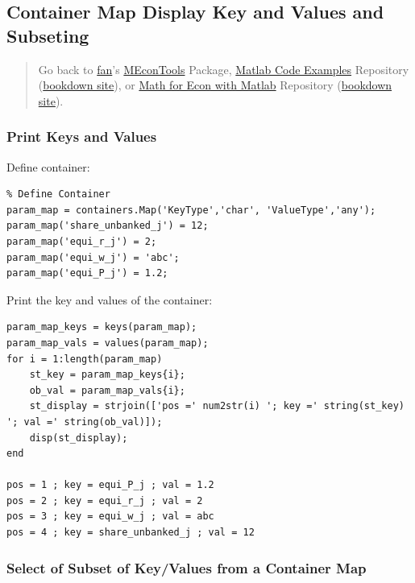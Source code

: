 \documentclass[
]{book}
\begin{document}
\hypertarget{container-map-display-key-and-values-and-subseting}{%
\subsection{Container Map Display Key and Values and Subseting}\label{container-map-display-key-and-values-and-subseting}}

\begin{quote}
Go back to \href{http://fanwangecon.github.io/}{fan}'s \href{https://fanwangecon.github.io/MEconTools/}{MEconTools} Package, \href{https://fanwangecon.github.io/M4Econ/}{Matlab Code Examples} Repository (\href{https://fanwangecon.github.io/M4Econ/bookdown}{bookdown site}), or \href{https://fanwangecon.github.io/Math4Econ/}{Math for Econ with Matlab} Repository (\href{https://fanwangecon.github.io/Math4Econ/bookdown}{bookdown site}).
\end{quote}

\hypertarget{print-keys-and-values}{%
\subsubsection{Print Keys and Values}\label{print-keys-and-values}}

Define container:

\begin{verbatim}
% Define Container
param_map = containers.Map('KeyType','char', 'ValueType','any');
param_map('share_unbanked_j') = 12;
param_map('equi_r_j') = 2;
param_map('equi_w_j') = 'abc';
param_map('equi_P_j') = 1.2;
\end{verbatim}

Print the key and values of the container:

\begin{verbatim}
param_map_keys = keys(param_map);
param_map_vals = values(param_map);
for i = 1:length(param_map)
    st_key = param_map_keys{i};
    ob_val = param_map_vals{i};
    st_display = strjoin(['pos =' num2str(i) '; key =' string(st_key) '; val =' string(ob_val)]);
    disp(st_display);
end

pos = 1 ; key = equi_P_j ; val = 1.2
pos = 2 ; key = equi_r_j ; val = 2
pos = 3 ; key = equi_w_j ; val = abc
pos = 4 ; key = share_unbanked_j ; val = 12
\end{verbatim}

\hypertarget{select-of-subset-of-keyvalues-from-a-container-map}{%
\subsubsection{Select of Subset of Key/Values from a Container Map}\label{select-of-subset-of-keyvalues-from-a-container-map}}
\end{document}
